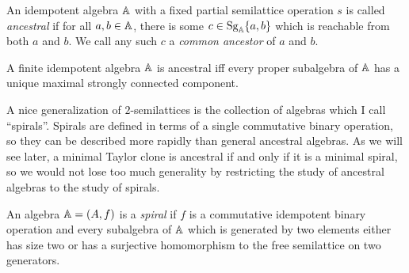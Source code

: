 \documentclass[letterpaper,11pt]{article}
\DeclareMathOperator{\Sg}{Sg}
\begin{document}
\begin{defn} An idempotent algebra $\mathbb{A}$ with a fixed partial semilattice operation $s$ is called \emph{ancestral} if for all $a,b \in \mathbb{A}$, there is some $c \in \Sg_{\bA}\{a,b\}$ which is reachable from both $a$ and $b$. We call any such $c$ a \emph{common ancestor} of $a$ and $b$.
\end{defn}

\begin{prop}\label{ancestral-maximal} A finite idempotent algebra $\mathbb{A}$ is ancestral iff every proper subalgebra of $\mathbb{A}$ has a unique maximal strongly connected component.
\end{prop}

A nice generalization of $2$-semilattices is the collection of algebras which I call ``spirals''. Spirals are defined in terms of a single commutative binary operation, so they can be described more rapidly than general ancestral algebras. As we will see later, a minimal Taylor clone is ancestral if and only if it is a minimal spiral, so we would not lose too much generality by restricting the study of ancestral algebras to the study of spirals.

\begin{defn} An algebra $\mathbb{A} = (A,f)$ is a \emph{spiral} if $f$ is a commutative idempotent binary operation and every subalgebra of $\mathbb{A}$ which is generated by two elements either has size two or has a surjective homomorphism to the free semilattice on two generators.
\end{defn}
\end{document}
